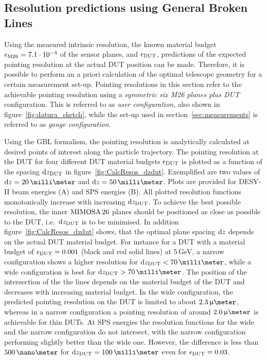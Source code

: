 \subsection{Resolution predictions using General Broken Lines}

Using the measured intrinsic resolution, the known material budget $\mathnormal{\epsilon_{\textrm{M26}}} = 7.1\cdot 10^{-4}$ of the sensor planes, and $\mathnormal{\epsilon_{\textrm{DUT}}}$,
 predictions of the expected pointing resolution at the actual DUT position can be made. 
Therefore, it is possible to perform an a priori calculation of the optimal telescope geometry for a certain measurement set-up. 
Pointing resolutions in this section refer to the achievable pointing resolution using a \textit{symmetric six M26 planes plus DUT} configuration. 
This is referred to as \textit{user configuration}, also shown in figure~\ref{fig:datura_sketch}, while the set-up used in section~\ref{sec:measurements} is referred to as \textit{gauge configuration}. 

Using the GBL formalism, the pointing resolution is analytically calculated at desired points of interest along the particle trajectory. 
The pointing resolution at the DUT for four different DUT material budgets $\mathnormal{\epsilon_{\textrm{DUT}}}$ is plotted as a function of the spacing $\textrm{d}z_{\textrm{DUT}}$ in figure~\ref{fig:CalcResos_dzdut}.
Exemplified are two values of $\dz = 20\,\milli\meter$ and $\dz = 50\,\milli\meter$. 
Plots are provided for DESY-II beam energies (A) and SPS energies (B). 
All plotted resolution functions monotonically increase with increasing $\textrm{d}z_{\textrm{DUT}}$. 
To achieve the best possible resolution, the inner $\textrm{MIMOSA\,26}$ planes should be positioned as close as possible to the DUT, i.e.~$\textrm{d}z_{\textrm{DUT}}$ is to be minimised. 
In addition figure~\ref{fig:CalcResos_dzdut} shows, that the optimal plane spacing $\textrm{d}z$ depends on the actual DUT material budget.
For instance for a DUT with a material budget of $\mathnormal{\epsilon_{\textrm{DUT}}} = 0.001$ (black and red solid lines) at 5\,GeV, a narrow configuration shows a higher resolution for $\dzdut < 70\,\milli\meter$,
 while a wide configuration is best for $\dzdut > 70\,\milli\meter$.
The position of the intersection of the the lines depends on the material budget of the DUT and decreases with increasing material budget. 
In the wide configuration, the predicted pointing resolution on the DUT is limited to about $2.3\,\upmu\meter$,
 whereas in a narrow configuration a pointing resolution of around $2.0\,\upmu\meter$ is achievable for thin DUTs.
At SPS energies the resolution functions for the wide and the narrow configuration do not intersect, with the narrow configuration performing slightly better than the wide one.
However, the difference is less than $500\,\nano\meter$ for $\dzdut = 100\,\milli\meter$ even for $\mathnormal{\epsilon_{\textrm{DUT}}} = 0.03$. 

